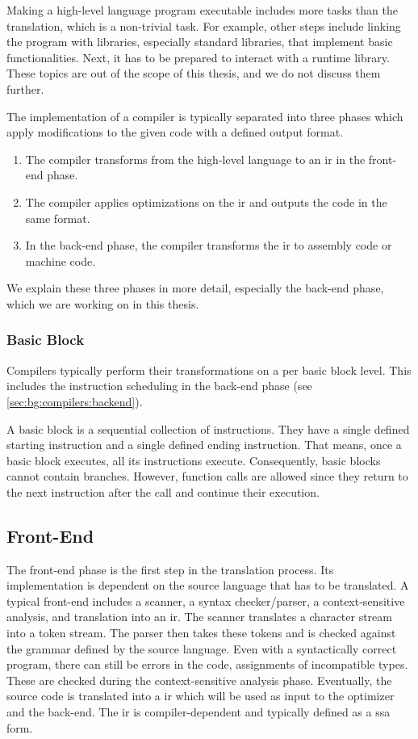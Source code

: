 Making a high-level language program executable includes more tasks than the translation, which is a non-trivial task.
For example, other steps include linking the program with libraries, especially standard libraries, that implement basic functionalities.
Next, it has to be prepared to interact with a runtime library.
These topics are out of the scope of this thesis, and we do not discuss them further.

The implementation of a compiler is typically separated into three phases which apply modifications to the given code with a defined output format.
\begin{enumerate}
    \item The compiler transforms from the high-level language to an \ac{ir} in the front-end phase.
    \item The compiler applies optimizations on the \ac{ir} and outputs the code in the same format.
    \item In the back-end phase, the compiler transforms the \ac{ir} to assembly code or machine code.
\end{enumerate}
We explain these three phases in more detail, especially the back-end phase, which we are working on in this thesis.

\subsubsection{Basic Block}
Compilers typically perform their transformations on a per basic block level.
This includes the instruction scheduling in the back-end phase (see \cref{sec:bg:compilers:backend}).

A basic block is a sequential collection of instructions.
They have a single defined starting instruction and a single defined ending instruction.
That means, once a basic block executes, all its instructions execute.
Consequently, basic blocks cannot contain branches.
However, function calls are allowed since they return to the next instruction after the call and continue their execution.

\subsection{Front-End}
\label{sec:bg:compilers:frontend}
The front-end phase is the first step in the translation process.
Its implementation is dependent on the source language that has to be translated.
A typical front-end includes a scanner, a syntax checker/parser, a context-sensitive analysis, and translation into an \ac{ir}.
The scanner translates a character stream into a token stream.
The parser then takes these tokens and is checked against the grammar defined by the source language.
Even with a syntactically correct program, there can still be errors in the code, \eg assignments of incompatible types.
These are checked during the context-sensitive analysis phase.
Eventually, the source code is translated into a \ac{ir} which will be used as input to the optimizer and the back-end.
The \ac{ir} is compiler-dependent and typically defined as a \ac{ssa} form.


